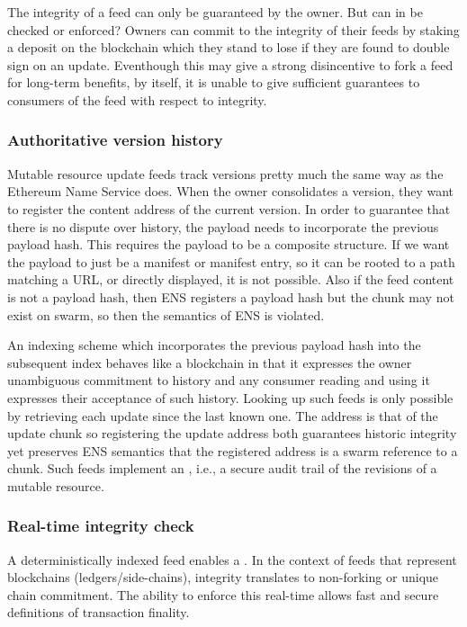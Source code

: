 The integrity of a feed can only be guaranteed by the owner. But can in be checked or enforced? Owners can commit to the integrity of their feeds by staking a deposit on the blockchain which they stand to lose if they are found to double sign on an update. Eventhough this may give a strong disincentive to fork a feed for long-term benefits, by itself, it is unable to give sufficient guarantees to consumers of the feed with respect to  integrity. 

\subsubsection{Authoritative version history}

Mutable resource update feeds track versions pretty much the same way as the Ethereum Name Service does.  
When the owner consolidates a version, they want to register the content address of the current version. In order to guarantee that there is no dispute over history, the payload needs to incorporate the previous payload hash. This requires the payload to be a composite structure. If we want the payload to just be a manifest or manifest entry, so it can be rooted to a path matching a URL, or directly displayed, it  is not possible. Also if the feed content is not a payload hash, then ENS registers a payload hash but the chunk may not exist on swarm, so then the semantics of ENS is violated.

An indexing scheme which incorporates the previous payload hash into the subsequent index behaves like a blockchain in that it expresses the owner unambiguous commitment to history and any consumer reading and using it expresses their acceptance of such history. 
Looking up such feeds is only possible by retrieving each update since the last  known one. The address is that of the update chunk so registering the update address both guarantees historic integrity yet preserves ENS semantics that the registered address is a swarm reference to a chunk.
Such feeds implement an , i.e., a secure audit trail of the revisions of a mutable resource. 

\subsubsection{Real-time integrity check}

A deterministically indexed feed enables a . In the context of feeds that represent blockchains (ledgers/side-chains), integrity translates to non-forking or unique chain commitment. The ability to enforce this real-time allows fast and secure definitions of transaction finality. 


